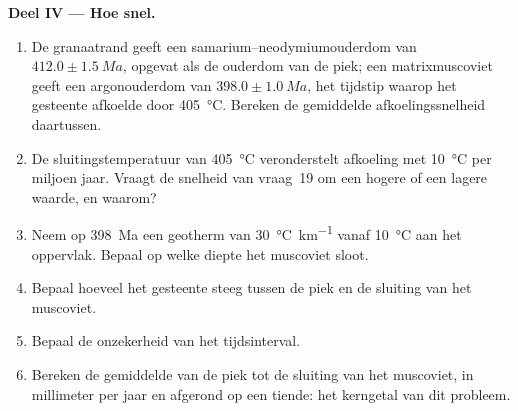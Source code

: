 \begin{problem}
\noindent\textbf{Deel IV --- Hoe snel.}
\begin{enumerate}[resume]
\item De granaatrand geeft een samarium--neodymiumouderdom van $412.0 \pm \qty{1.5}{Ma}$, opgevat
als de ouderdom van de piek; een matrixmuscoviet geeft een argonouderdom van $398.0 \pm
\qty{1.0}{Ma}$, het tijdstip waarop het gesteente afkoelde door \qty{405}{\celsius}. Bereken
de gemiddelde afkoelingssnelheid daartussen.
\item De sluitingstemperatuur van \qty{405}{\celsius} veronderstelt afkoeling met
\qty{10}{\celsius} per miljoen jaar. Vraagt de snelheid van vraag~19 om een hogere of een
lagere waarde, en waarom?
\item Neem op \qty{398}{Ma} een geotherm van \qty{30}{\celsius\per\km} vanaf
\qty{10}{\celsius} aan het oppervlak. Bepaal op welke diepte het muscoviet sloot.
\item Bepaal hoeveel het gesteente steeg tussen de piek en de sluiting van het muscoviet.
\item Bepaal de onzekerheid van het tijdsinterval.
\item Bereken de gemiddelde  van de piek tot de sluiting van het muscoviet, in
millimeter per jaar en afgerond op een tiende: het kerngetal van dit probleem.
\end{enumerate}
\end{problem}
